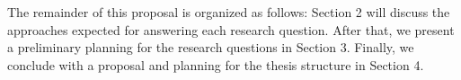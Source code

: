 The remainder of this proposal is organized as follows:
Section 2 will discuss the approaches expected for answering each research question.
After that, we present a preliminary planning for the research questions in Section 3.
Finally, we conclude with a proposal and planning for the thesis structure in Section 4.
